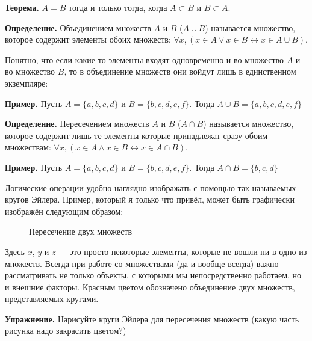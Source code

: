 {\bfseries Теорема.}  $A=B$ тогда и только тогда, когда $A\subset B$ и $B \subset A$.

{\bfseries Определение.} Объединением множеств $A$ и $B$ ($A\cup B$) называется множество, которое содержит элементы обоих множеств: $\forall x, (x\in A \vee x \in B \leftrightarrow x\in A\cup B)$.

Понятно, что если какие-то элементы входят одновременно и во множество $A$ и во множество $B$, то в объединение множеств они войдут лишь в единственном экземпляре:

{\bfseries Пример.} Пусть $A = \{a, b, c, d\}$ и $B = \{b, c, d, e, f\}$. Тогда $A\cup B = \{a, b, c, d, e, f\}$

{\bfseries Определение.} Пересечением множеств $A$ и $B$ ($A\cap B$) называется множество, которое содержит лишь те элементы которые принадлежат сразу обоим множествам: $\forall x, (x\in A \wedge x \in B \leftrightarrow x\in A\cap B)$.

{\bfseries Пример.} Пусть $A = \{a, b, c, d\}$ и $B = \{b, c, d, e, f\}$. Тогда $A\cap B = \{b, c, d\}$

Логические операции удобно наглядно изображать с помощью так называемых кругов Эйлера. Пример, который я только что привёл, может быть графически изображён следующим образом:

\begin{figure}[h]
\centering
\def\seta{(-1,0) circle (2)}
\def\setb{(1,0) circle (2)}
\caption{Пересечение двух множеств}
\end{figure}

Здесь $x$, $y$ и $z$ — это просто некоторые элементы, которые не вошли ни в одно из множеств. Всегда при работе со множествами (да и вообще всегда) важно рассматривать не только объекты, с которыми мы непосредственно работаем, но и внешние факторы. Красным цветом обозначено объединение двух множеств, представляемых кругами.

{\bfseries Упражнение.} Нарисуйте круги Эйлера для пересечения множеств (какую часть рисунка надо закрасить цветом?)

